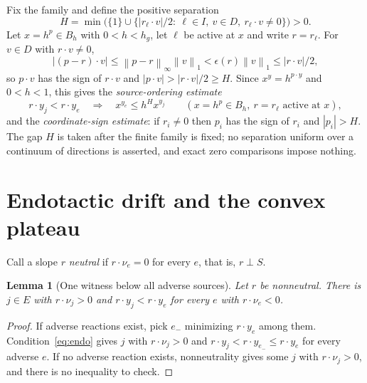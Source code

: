 \documentclass[11pt]{article}
\newtheorem{lemma}[theorem]{Lemma}
\theoremstyle{definition}
\theoremstyle{remark}
\newcommand{\norm}[1]{\left\|#1\right\|}
\begin{document}
Fix the family and define the positive separation
\begin{equation}\label{eq:gap}
 H=\min\bigl(\{1\}\cup\{|r_\ell\cdot v|/2:\ \ell\in I,\ v\in D,\ r_\ell\cdot v\ne0\}\bigr)>0 .
\end{equation}
Let $x=h^{p}\in B_h$ with $0<h<h_g$, let $\ell$ be active at $x$ and write
$r=r_\ell$. For $v\in D$ with $r\cdot v\ne0$,
\[
 |(p-r)\cdot v|\le\norm{p-r}_\infty\norm{v}_1<\epsilon(r)\norm{v}_1\le|r\cdot v|/2 ,
\]
so $p\cdot v$ has the sign of $r\cdot v$ and $|p\cdot v|>|r\cdot v|/2\ge H$. Since
$x^{y}=h^{p\cdot y}$ and $0<h<1$, this gives the \emph{source-ordering estimate}
\begin{equation}\label{eq:ratio}
 r\cdot y_j<r\cdot y_e\quad\Longrightarrow\quad x^{y_e}\le h^{H}x^{y_j}
 \qquad(x=h^{p}\in B_h,\ r=r_\ell\text{ active at }x),
\end{equation}
and the \emph{coordinate-sign estimate}: if $r_i\ne0$ then $p_i$ has the sign of
$r_i$ and $|p_i|>H$. The gap $H$ is taken after the finite family is fixed; no
separation uniform over a continuum of directions is asserted, and exact zero
comparisons impose nothing.

\section{Endotactic drift and the convex plateau}\label{sec:drift}

Call a slope $r$ \emph{neutral} if $r\cdot\nu_e=0$ for every $e$, that is,
$r\perp S$.

\begin{lemma}[One witness below all adverse sources]\label{lem:witness}
Let $r$ be nonneutral. There is $j\in E$ with $r\cdot\nu_j>0$ and
$r\cdot y_j<r\cdot y_e$ for every $e$ with $r\cdot\nu_e<0$.
\end{lemma}
\begin{proof}
If adverse reactions exist, pick $e_-$ minimizing $r\cdot y_e$ among them.
Condition~\eqref{eq:endo} gives $j$ with $r\cdot\nu_j>0$ and
$r\cdot y_j<r\cdot y_{e_-}\le r\cdot y_e$ for every adverse $e$. If no adverse
reaction exists, nonneutrality gives some $j$ with $r\cdot\nu_j>0$, and there is no
inequality to check.
\end{proof}
\end{document}
